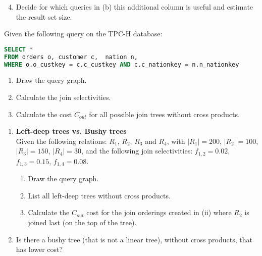 \begin{enumerate}
\setcounter{enumi}{3}
\item Decide for which queries in (b) this additional column is useful and estimate the result set size.

\end{enumerate}

\newpage
{}

Given the following query on the TPC-H database:

\begin{lstlisting}[language=sql]
SELECT *
FROM orders o, customer c,  nation n,
WHERE o.o_custkey = c.c_custkey AND c.c_nationkey = n.n_nationkey
\end{lstlisting}

\begin{enumerate}
\item
 Draw the query graph.

\item
 Calculate the join selectivities.

\item
 Calculate the cost $C_{out}$ for all possible join trees without cross products.

\end{enumerate}


\begin{enumerate}
\item
  {\bf Left-deep trees vs. Bushy trees}\\
  Given the following relations: $R_1$, $R_2$, $R_3$ and $R_4$,
  with $|R_1|=200$, $|R_2|=100$, $|R_3|=150$, $|R_4|=30$, and the following join selectivities:
  $f_{1,2}= 0.02$, $f_{1,3}= 0.15$, $f_{1,4}= 0.08$. 

  \begin{enumerate}
    \item Draw the query graph.

    \item List all left-deep trees without cross products. 

    \item Calculate the $C_{out}$ cost for the join orderings created in (ii) where $R_2$ is joined last (on the top of the tree).

  \end{enumerate}

  \item   Is there a bushy tree (that is not a linear tree), without cross products, that has lower cost?

\end{enumerate}

